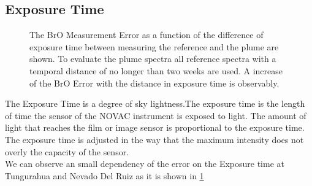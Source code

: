 \documentclass  [
  paper    = a4,
  BCOR     = 10mm,
  twoside,
  fontsize = 12pt,
  fleqn,
  toc      = bibnumbered,
  toc      = listofnumbered,
  numbers  = noendperiod,
  headings = normal,
  listof   = leveldown,
  version  = 3.03
]                                       {scrreprt}
\begin{document}
	\subsection{Exposure Time}
	\begin{figure}		
		\caption{The BrO Measurement Error as a function of the difference of exposure time between measuring the reference and the plume are shown. To evaluate the plume spectra all reference spectra with a temporal distance of no longer than two weeks are used. A increase of the BrO Error with the distance in exposure time is observably.}
		\label{fig:diffexptime}
	\end{figure}
	The Exposure Time is a degree of sky lightness.The  exposure time is the length of time the sensor of the NOVAC instrument is exposed to light. The amount of light that reaches the film or image sensor is proportional to the exposure time. The exposure time is adjusted in the way that the maximum intensity does not overly the capacity of the sensor.\\
	We can observe an small dependency of the  error on the Exposure time at Tungurahua and Nevado Del Ruiz as it is shown in \cref{fig:diffexptime}
	
\end{document}
